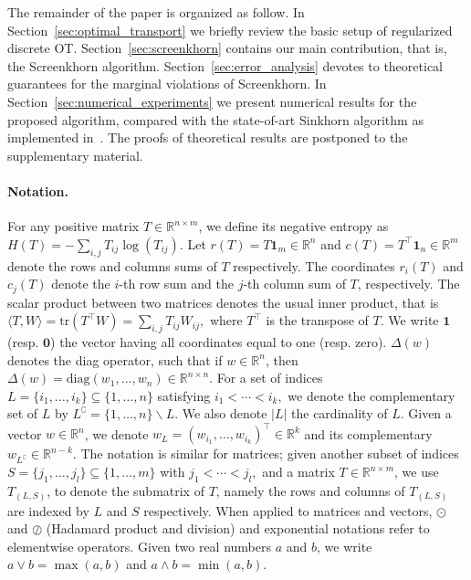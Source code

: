 \documentclass{article}
\newcommand{\inr}[1]{\langle #1 \rangle}
\newcommand{\R}{{\mathbb{R}}}
\begin{document}

The remainder of the paper is organized as follow. In Section~\ref{sec:optimal_transport} we briefly review the basic setup of regularized discrete OT. 
Section~\ref{sec:screenkhorn} contains our main contribution, that is, the Screenkhorn algorithm. 
Section~\ref{sec:error_analysis} devotes to theoretical guarantees for the marginal violations of Screenkhorn. 
In Section~\ref{sec:numerical_experiments} we present numerical results for the proposed algorithm, compared with the state-of-art Sinkhorn algorithm as implemented in~\cite{flamary2017pot}. 
The proofs of theoretical results are postponed to the supplementary material.


\paragraph{Notation.}

For any positive matrix $T \in \R^{n\times m}$, we define its negative entropy as $H(T) = -\sum_{i,j} T_{ij} \log(T_{ij}).$
Let $r(T) = T\mathbf 1_m \in \R^n$ and $c(T) = T^\top\mathbf 1_n \in \R^m$ denote the rows and columns sums of $T$ respectively. The coordinates $r_i(T)$ and $c_j(T)$ denote the $i$-th row sum and the $j$-th column sum of $T$, respectively.
The scalar product between two matrices denotes the usual inner product, that is $\inr{T, W} = \text{tr}(T^\top W) = \sum_{i,j}T_{ij}W_{ij},$ where $T^\top$ is the transpose of $T$. 
We write $\mathbf{1}$ (resp. $\mathbf{0}$) the vector having all coordinates equal to one (resp. zero).
$\Delta(w)$ denotes the diag operator, such that if $w \in \R^n$, then $\Delta(w) = \text{diag}(w_1, \ldots, w_n)\in \R^{n\times n}$.
For a set of indices $L=\{i_1, \ldots, i_k\} \subseteq \{1, \ldots, n\}$ satisfying $i_1 < \cdots <i_k,$ we denote the complementary set of $L$ by $L^\complement = \{1, \ldots, n\} \backslash L$. We also denote $|L|$ the cardinality of $L$.
Given a vector $w \in \R^n$, we denote $w_L= (w_{i_1}, \ldots, w_{i_k})^\top \in \R^k$ and its complementary $w_{L^\complement} \in \R^{n- k}$.  The notation is similar for matrices; given another subset of indices $S = \{j_1, \ldots, j_l\} \subseteq \{1, \ldots, m\}$ with $j_1 < \cdots <j_l,$ and a matrix $T\in \R^{n\times m}$, we use $T_{(L,S)}$, to denote the submatrix of $T$, namely the rows and columns of $T_{(L,S)}$ are indexed by $L$ and $S$ respectively.
When applied to matrices and vectors,  $\odot$ and $\oslash$ (Hadamard product and division) and exponential notations refer to elementwise operators.
Given two real numbers $a$ and $b$, we write $a\vee b = \max(a,b)$ and $a\wedge b = \min(a,b).$
\end{document}
